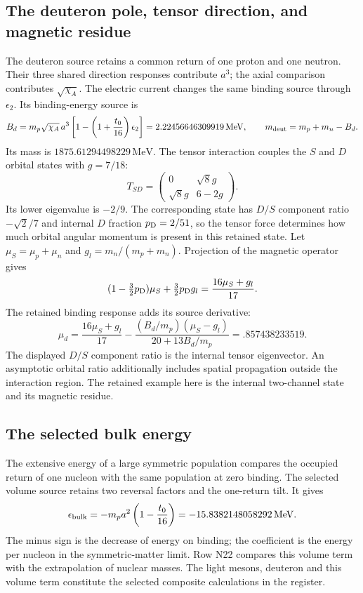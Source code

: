 \documentclass[aps,prx,onecolumn,10pt,notitlepage,nofootinbib,longbibliography]{revtex4-2}
\numberwithin{equation}{section}
\numberwithin{table}{section}
\newcommand{\MeV}{\,\mathrm{MeV}}
\begin{document}
\subsection{The deuteron pole, tensor direction, and magnetic residue}
The deuteron source retains a common return of one proton and one neutron. Their three shared direction responses contribute $a^3$; the axial comparison contributes $\sqrt{\chi_A}$. The electric current changes the same binding source through $\epsilon_2$. Its binding-energy source is
\begin{equation}
 B_d=m_p\sqrt{\chi_A}\,a^3
 \left[1-\left(1+\frac{t_0}{16}\right)\epsilon_2\right]
 =2.22456646309919\MeV,
 \qquad m_{\rm deut}=m_p+m_n-B_d.
 \label{eq:deuteron}
\end{equation}
Its mass is $1875.61294498229\MeV$. The tensor interaction couples the $S$ and $D$ orbital states with $g=7/18$:
\begin{equation}
 T_{SD}=\begin{pmatrix}0&\sqrt8g\\\sqrt8g&6-2g\end{pmatrix}.
\end{equation}
Its lower eigenvalue is $-2/9$. The corresponding state has $D/S$ component ratio $-\sqrt2/7$ and internal $D$ fraction $p_{\rm D}=2/51$, so the tensor force determines how much orbital angular momentum is present in this retained state. Let $\mu_S=\mu_p+\mu_n$ and $g_l=m_n/(m_p+m_n)$. Projection of the magnetic operator gives
\begin{equation}
 (1-\tfrac32p_{\rm D})\mu_S+\tfrac32p_{\rm D}g_l=\frac{16\mu_S+g_l}{17}.
\end{equation}
The retained binding response adds its source derivative:
\begin{equation}
 \mu_d=\frac{16\mu_S+g_l}{17}
 -\frac{(B_d/m_p)(\mu_S-g_l)}{20+13B_d/m_p}
 =.857438233519.\label{eq:magneticdeuteron}
\end{equation}
The displayed $D/S$ component ratio is the internal tensor eigenvector. An asymptotic orbital ratio additionally includes spatial propagation outside the interaction region. The retained example here is the internal two-channel state and its magnetic residue.

\subsection{The selected bulk energy}
The extensive energy of a large symmetric population compares the occupied return of one nucleon with the same population at zero binding. The selected volume source retains two reversal factors and the one-return tilt. It gives
\begin{equation}
 \epsilon_{\rm bulk}=-m_pa^2\left(1-\frac{t_0}{16}\right)
 =-15.8382148058292\MeV.
 \label{eq:bulkenergy}
\end{equation}
The minus sign is the decrease of energy on binding; the coefficient is the energy per nucleon in the symmetric-matter limit. Row N22 compares this volume term with the extrapolation of nuclear masses. The light mesons, deuteron and this volume term constitute the selected composite calculations in the register.
\end{document}
